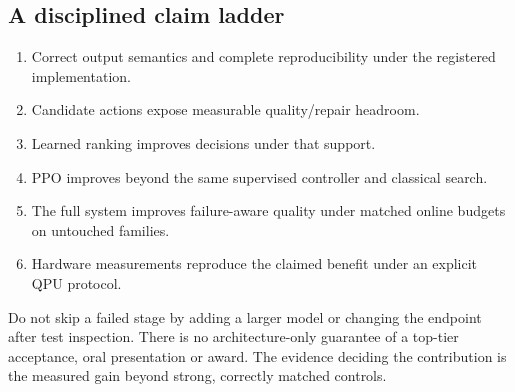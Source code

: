 \subsection{A disciplined claim ladder}
\begin{enumerate}
\item Correct output semantics and complete reproducibility under the registered implementation.
\item Candidate actions expose measurable quality/repair headroom.
\item Learned ranking improves decisions under that support.
\item PPO improves beyond the same supervised controller and classical search.
\item The full system improves failure-aware quality under matched online budgets on untouched families.
\item Hardware measurements reproduce the claimed benefit under an explicit QPU protocol.
\end{enumerate}
Do not skip a failed stage by adding a larger model or changing the endpoint after test inspection. There is no architecture-only guarantee of a top-tier acceptance, oral presentation or award. The evidence deciding the contribution is the measured gain beyond strong, correctly matched controls.

